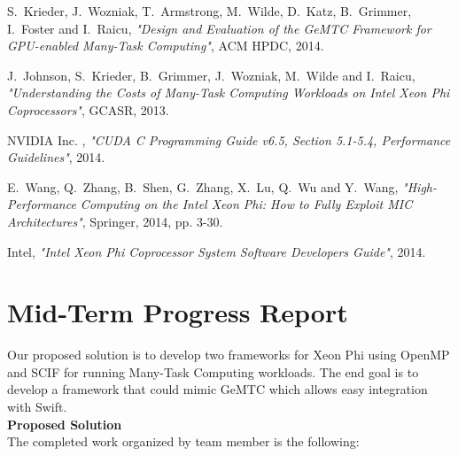 \documentclass[10pt, conference, compsocconf]{IEEEtran}
\begin{document}
%
%
%
\begin{thebibliography}{1}

S.~Krieder, J.~Wozniak, T.~Armstrong, M.~Wilde, D.~Katz, B.~Grimmer,
I.~Foster and I.~Raicu, \emph{"Design and Evaluation of the GeMTC
Framework for GPU-enabled Many-Task Computing"}, ACM HPDC, 2014.

J.~Johnson, S.~Krieder, B.~Grimmer, J.~Wozniak, M.~Wilde and I.~Raicu,
\emph{"Understanding the Costs of Many-Task Computing Workloads
on Intel Xeon Phi Coprocessors"}, GCASR, 2013.

NVIDIA Inc. , \emph{"CUDA C Programming Guide v6.5, Section 5.1-5.4,
Performance Guidelines"}, 2014.

E.~Wang, Q.~Zhang, B.~Shen, G.~Zhang, X.~Lu, Q.~Wu and Y.~Wang,
\emph{"High-Performance Computing on the Intel Xeon Phi: How to
Fully Exploit MIC Architectures"}, Springer, 2014, pp. 3-30.

Intel,
\emph{"Intel Xeon Phi Coprocessor System Software Developers Guide"},
2014.

\end{thebibliography}


\newpage

\section{Mid-Term Progress Report}

Our proposed solution is to develop two frameworks for Xeon Phi using OpenMP and 
SCIF for running Many-Task Computing workloads. The end goal is to develop a 
framework that could mimic GeMTC which allows easy integration with Swift.\\

\textbf{Proposed Solution}\\
The completed work organized by team member is the following:\\
\end{document}
